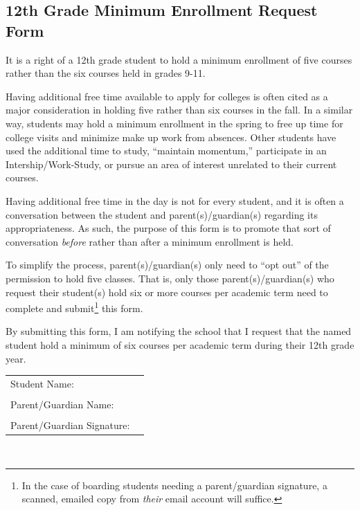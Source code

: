 \newpage



\subsection{12th Grade Minimum Enrollment Request Form}

It is a right of a 12th grade student to hold a minimum enrollment of five courses  rather than the six courses held in grades 9-11.

Having additional free time available to apply for colleges is often cited as a major consideration in holding five rather than six courses in the fall.  In a similar way, students may hold a minimum enrollment in the spring to free up time for college visits and minimize make up work from absences.  Other students have used the additional time to study, ``maintain momentum,'' participate in an Intership/Work-Study, or pursue an area of interest unrelated to their current courses.

Having additional free time in the day is not for every student, and it is often a conversation between the student and parent(s)/guardian(s) regarding its appropriateness.  As such, the purpose of this form is to promote that sort of conversation \emph{before} rather than after a minimum enrollment is held.

To simplify the process, parent(s)/guardian(s) only need to ``opt out'' of the permission to hold five classes.  That is, only those parent(s)/guardian(s) who request their student(s)  hold six or more courses per academic term need to complete and submit\footnote{In the case of boarding students needing a parent/guardian signature, a scanned, emailed copy from \emph{their} email account will suffice.} this form.



\vspace{1cm}

\noindent \hrulefill

\vspace{1cm}

\noindent By submitting this form, I am notifying the school that I request that the named student hold a minimum of six courses per academic term during their 12th grade year.

\vspace{1cm}

\renewcommand{\arraystretch}{1}
\noindent\begin{tabular}{ll}
Student Name:  & \underline{\hspace{7cm}}\\
&\\
Parent/Guardian Name: & \underline{\hspace{7cm}}\\
&\\
Parent/Guardian Signature: & \underline{\hspace{7cm}}\\
\end{tabular}\\

